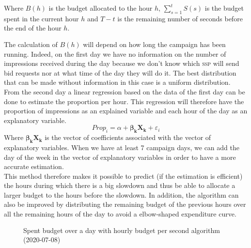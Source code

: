 \documentclass[12pt]{article}
\begin{document}
Where $B(h)$ is the budget allocated to the hour $h$, $\displaystyle \sum_{s=1}^{t} S(s)$ is the budget spent in the current hour $h$ and $T - t$ is the remaining number of seconds before the end of the hour $h$.

The calculation of $B(h)$ will depend on how long the campaign has been running. Indeed, on the first day we have no information on the number of impressions received during the day because we don't know which \textsc{ssp} will send bid requests nor at what time of the day they will do it. The best distribution that can be made without information in this case is a uniform distribution. From the second day a linear regression based on the data of the first day can be done to estimate the proportion per hour. This regression will therefore have the proportion of impressions as an explained variable and each hour of the day as an explanatory variable. 
$$ Prop_i = \alpha + \bm{\beta_k} \mathbf{X_k} +\varepsilon_i$$
Where $\bm{\beta_k} \mathbf{X_k}$ is the vector of coefficients associated with the vector of explanatory variables. When we have at least 7 campaign days, we can add the day of the week in the vector of explanatory variables in order to have a more accurate estimation. \\

This method therefore makes it possible to predict (if the estimation is efficient) the hours during which there is a big slowdown and thus be able to allocate a larger budget to the hours before the slowdown. In addition, the algorithm can also be improved by distributing the remaining budget of the previous hours over all the remaining hours of the day to avoid a elbow-shaped expenditure curve. 

\begin{figure}[h!]
	\centering
	\vspace{-.7cm}
	\caption{Spent budget over a day with hourly budget per second algorithm (2020-07-08)}
	\label{good_et}
\end{figure}
\end{document}
